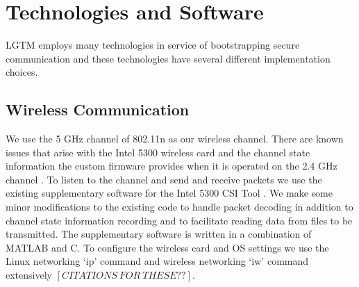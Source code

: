 \documentclass[12pt]{report}
\begin{document}


\section{Technologies and Software}

LGTM employs many technologies in service of bootstrapping secure communication and these technologies have several different implementation choices. \par

\subsection{Wireless Communication}
We use the 5 GHz channel of 802.11n as our wireless channel. There are known issues that arise with the Intel 5300 wireless card and the channel state information the custom firmware provides when it is operated on the 2.4 GHz channel \cite{PhaserGjengset2014,SpotFiKotaru2015}. To listen to the channel and send and receive packets we use the existing supplementary software for the Intel 5300 CSI Tool \cite{ChannelStateInformationToolReleaseHalperin2011}. We make some minor modifications to the existing code to handle packet decoding in addition to channel state information recording and to facilitate reading data from files to be transmitted. The supplementary software is written in a combination of MATLAB and C. To configure the wireless card and OS settings we use the Linux networking `ip' command and wireless networking `iw' command extensively $[CITATIONS \: FOR \: THESE??]$. \par
\end{document}
